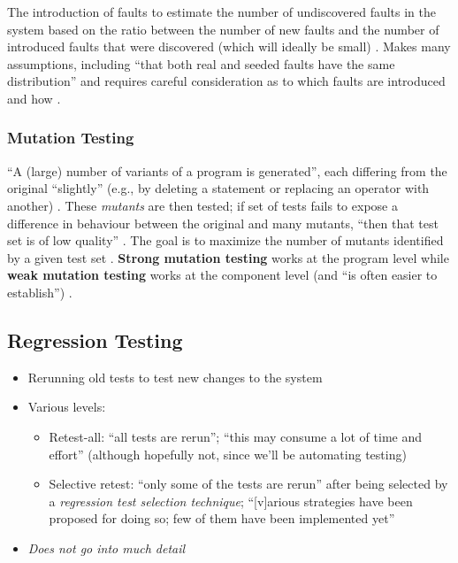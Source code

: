 The introduction of faults to estimate the number of undiscovered faults in the
system based on the ratio between the number of new faults and the number of
introduced faults that were discovered (which will ideally be small)
\cite[p.~427]{van_vliet_software_2000}. Makes many assumptions, including
``that both real and seeded faults have the same distribution'' and requires
careful consideration as to which faults are introduced and how
\cite[p.~427]{van_vliet_software_2000}.

\subsubsection{Mutation Testing \cite[pp.~428-429]{van_vliet_software_2000}}

``A (large) number of variants of a program is generated'', each differing from
the original ``slightly'' (e.g., by deleting a statement or replacing an
operator with another) \cite[p.~428]{van_vliet_software_2000}. These
\emph{mutants} are then tested; if set of tests fails to expose a difference in
behaviour between the original and many mutants, ``then that test set is of low
quality'' \cite[pp.~428-429]{van_vliet_software_2000}. The goal is to maximize
the number of mutants identified by a given test set
\cite[p.~429]{van_vliet_software_2000}. \textbf{Strong mutation testing} works
at the program level while \textbf{weak mutation testing} works at the
component level (and ``is often easier to establish'')
\cite[p.~429]{van_vliet_software_2000}.

\subsection{Regression Testing}

\begin{itemize}
      \item Rerunning old tests to test new changes to the system
      \item Various levels:
            \begin{itemize}
                  \item Retest-all: ``all tests are rerun''; ``this may consume
                        a lot of time and effort''
                        \cite[p.~411]{van_vliet_software_2000} (although
                        hopefully not, since we'll be automating testing)
                  \item Selective retest: ``only some of the tests are rerun''
                        after being selected by a \emph{regression test
                              selection technique}; ``[v]arious strategies have
                        been proposed for doing so; few of them have been
                        implemented yet'' \cite[p.~411]{van_vliet_software_2000}
            \end{itemize}
      \item \emph{Does not go into much detail} 
\end{itemize}

